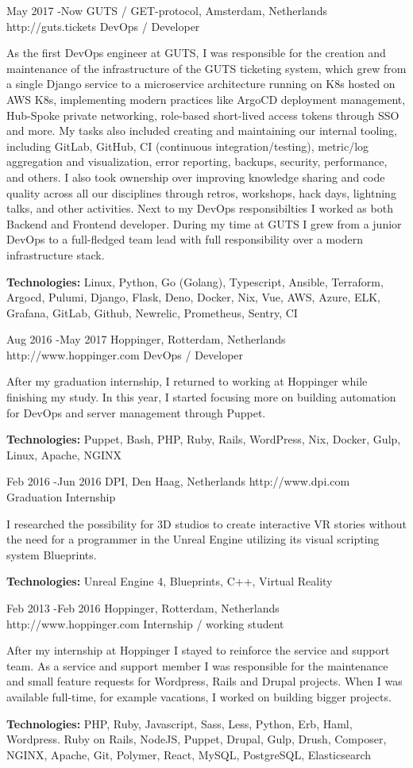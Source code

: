 \documentclass[10pt]{article} %
\begin{document}
\job
{May 2017 -}{Now}
{GUTS / GET-protocol, Amsterdam, Netherlands}
{http://guts.tickets}
{DevOps / Developer}
{As the first DevOps engineer at GUTS, I was responsible for the creation and maintenance of the infrastructure of the GUTS ticketing system, which grew from a single Django service to a microservice architecture running on K8s hosted on AWS K8s, implementing modern practices like ArgoCD deployment management, Hub-Spoke private networking, role-based short-lived access tokens through SSO and more. My tasks also included creating and maintaining our internal tooling, including GitLab, GitHub, CI (continuous integration/testing), metric/log aggregation and visualization, error reporting, backups, security, performance, and others. I also took ownership over improving knowledge sharing and code quality across all our disciplines through retros, workshops, hack days, lightning talks, and other activities. Next to my DevOps responsibilties I worked as both Backend and Frontend developer. During my time at GUTS I grew from a junior DevOps to a full-fledged team lead with full responsibility over a modern infrastructure stack.

\rule{0mm}{5mm}\textbf{Technologies:} Linux, Python, Go (Golang), Typescript, Ansible, Terraform, Argocd, Pulumi, Django, Flask, Deno, Docker, Nix, Vue, AWS, Azure, ELK, Grafana, GitLab, Github, Newrelic, Prometheus, Sentry, CI}

\job
{Aug 2016 -}{May 2017}
{Hoppinger, Rotterdam, Netherlands}
{http://www.hoppinger.com}
{DevOps / Developer}
{After my graduation internship, I returned to working at Hoppinger while finishing my study. In this year, I started focusing more on building automation for DevOps and server management through Puppet.

\rule{0mm}{5mm}\textbf{Technologies:} Puppet, Bash, PHP, Ruby, Rails, WordPress, Nix, Docker, Gulp, Linux, Apache, NGINX }

\job
{Feb 2016 -}{Jun 2016}
{DPI, Den Haag, Netherlands}
{http://www.dpi.com}
{Graduation Internship}
{I researched the possibility for 3D studios to create interactive VR stories without the need for a programmer in the Unreal Engine utilizing its visual scripting system Blueprints.\\

\rule{0mm}{5mm}\textbf{Technologies:} Unreal Engine 4, Blueprints, C++, Virtual Reality}

\job
{Feb 2013 -}{Feb 2016}
{Hoppinger, Rotterdam, Netherlands}
{http://www.hoppinger.com}
{Internship / working student}
{After my internship at Hoppinger I stayed to reinforce the service and support team. As a service and support member I was responsible for the maintenance and small feature requests for Wordpress, Rails and Drupal projects. When I was available full-time, for example vacations, I worked on building bigger projects.

\rule{0mm}{5mm}\textbf{Technologies:} PHP, Ruby, Javascript, Sass, Less, Python, Erb, Haml, Wordpress. Ruby on Rails, NodeJS, Puppet, Drupal, Gulp, Drush, Composer, NGINX, Apache, Git, Polymer, React, MySQL, PostgreSQL, Elasticsearch
}
\end{document}
